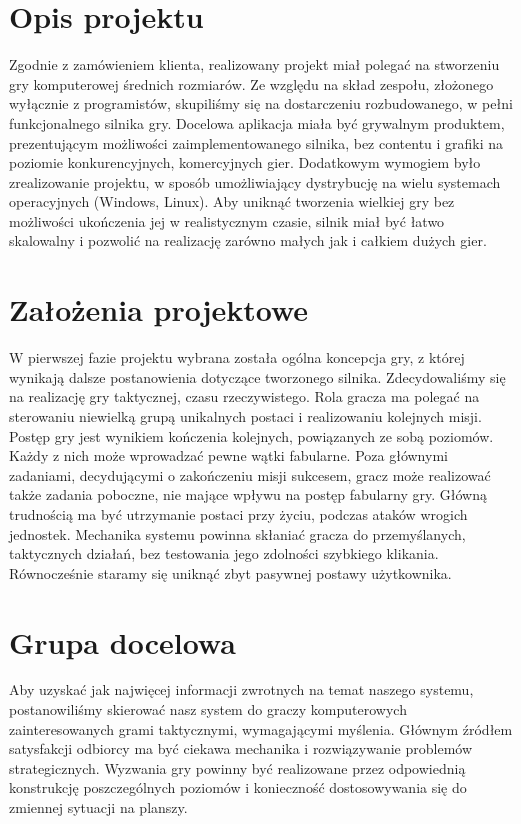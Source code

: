 \documentclass[licencjacka]{pracamgr}
\begin{document}
  \section{Opis projektu}
  Zgodnie z zamówieniem klienta, realizowany projekt miał polegać na stworzeniu gry komputerowej
  średnich rozmiarów. Ze względu na skład zespołu, złożonego wyłącznie z programistów, skupiliśmy się
  na dostarczeniu rozbudowanego, w pełni funkcjonalnego silnika gry.
  Docelowa aplikacja miała być grywalnym produktem, prezentującym możliwości zaimplementowanego silnika,
  bez contentu i grafiki na poziomie konkurencyjnych, komercyjnych gier. Dodatkowym wymogiem było zrealizowanie
  projektu, w sposób umożliwiający dystrybucję na wielu systemach operacyjnych (Windows, Linux). Aby uniknąć
  tworzenia wielkiej gry bez możliwości ukończenia jej w realistycznym czasie, silnik miał być łatwo skalowalny
  i pozwolić na realizację zarówno małych jak i całkiem dużych gier.

  \section{Założenia projektowe}
  W pierwszej fazie projektu wybrana została ogólna koncepcja gry, z której wynikają dalsze postanowienia dotyczące
  tworzonego silnika. Zdecydowaliśmy się na realizację gry taktycznej, czasu rzeczywistego. Rola gracza ma polegać
  na sterowaniu niewielką grupą unikalnych postaci i realizowaniu kolejnych misji. Postęp gry jest wynikiem kończenia
  kolejnych, powiązanych ze sobą poziomów. Każdy z nich może wprowadzać pewne wątki fabularne. Poza głównymi zadaniami,
  decydującymi o zakończeniu misji sukcesem, gracz może realizować także zadania poboczne, nie mające wpływu na
  postęp fabularny gry. Główną trudnością ma być utrzymanie postaci przy życiu, podczas ataków wrogich jednostek.
  Mechanika systemu powinna skłaniać gracza do przemyślanych, taktycznych działań, bez testowania jego zdolności
  szybkiego klikania. Równocześnie staramy się uniknąć zbyt pasywnej postawy użytkownika.

  \section{Grupa docelowa}
  Aby uzyskać jak najwięcej informacji zwrotnych na temat naszego systemu, postanowiliśmy skierować nasz system do
  graczy komputerowych zainteresowanych grami taktycznymi, wymagającymi myślenia. Głównym źródłem satysfakcji
  odbiorcy ma być ciekawa mechanika i rozwiązywanie problemów strategicznych. Wyzwania gry powinny być realizowane przez
  odpowiednią konstrukcję poszczególnych poziomów i konieczność dostosowywania się do zmiennej sytuacji na planszy.
\end{document}
